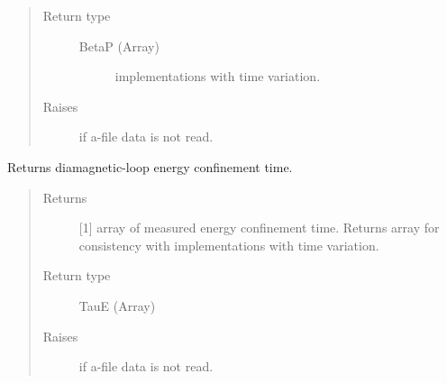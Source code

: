 \documentclass[letterpaper,10pt,english]{sphinxmanual}
\begin{document}
\begin{fulllineitems}
\begin{fulllineitems}
\begin{quote}
\begin{description}
\item[{Return type}] \leavevmode

BetaP (Array)
\begin{description}
\item[{{\hyperref[\detokenize{eqtools:eqtools.core.Equilibrium}]{}}}] \leavevmode
implementations with time variation.

\end{description}


\item[{Raises}] \leavevmode
{} \textendash{} if a-file data is not read.

\end{description}\end{quote}

\end{fulllineitems}


\begin{fulllineitems}
\label{\detokenize{eqtools:eqtools.eqdskreader.EqdskReader.getDiamagTauE}}
Returns diamagnetic-loop energy confinement time.
\begin{quote}\begin{description}
\item[{Returns}] \leavevmode
{[}1{]} array of measured energy confinement time.
Returns array for consistency with
{\hyperref[\detokenize{eqtools:eqtools.core.Equilibrium}]{}}
implementations with time variation.

\item[{Return type}] \leavevmode
TauE (Array)

\item[{Raises}] \leavevmode
{} \textendash{} if a-file data is not read.

\end{description}\end{quote}

\end{fulllineitems}



\end{fulllineitems}
\end{document}
